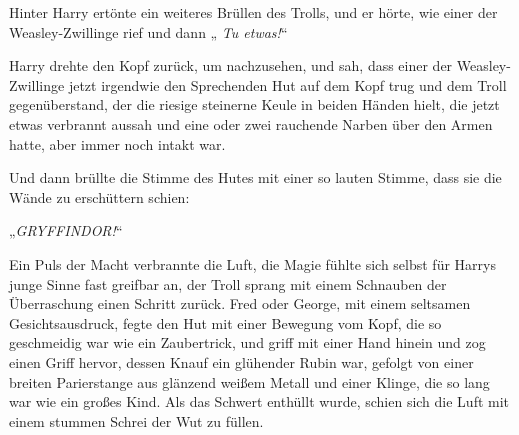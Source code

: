 Hinter Harry ertönte ein weiteres Brüllen des Trolls, und er hörte, wie einer der Weasley-Zwillinge  rief und dann „\emph{ Tu etwas!}“

Harry drehte den Kopf zurück, um nachzusehen, und sah, dass einer der Weasley-Zwillinge jetzt irgendwie den Sprechenden Hut auf dem Kopf trug und dem Troll gegenüberstand, der die riesige steinerne Keule in beiden Händen hielt, die jetzt etwas verbrannt aussah und eine oder zwei rauchende Narben über den Armen hatte, aber immer noch intakt war.

Und dann brüllte die Stimme des Hutes mit einer so lauten Stimme, dass sie die Wände zu erschüttern schien:

„\emph{GRYFFINDOR!}“

Ein Puls der Macht verbrannte die Luft, die Magie fühlte sich selbst für Harrys junge Sinne fast greifbar an, der Troll sprang mit einem Schnauben der Überraschung einen Schritt zurück. Fred oder George, mit einem seltsamen Gesichtsausdruck, fegte den Hut mit einer Bewegung vom Kopf, die so geschmeidig war wie ein Zaubertrick, und griff mit einer Hand hinein und zog einen Griff hervor, dessen Knauf ein glühender Rubin war, gefolgt von einer breiten Parierstange aus glänzend weißem Metall und einer Klinge, die so lang war wie ein großes Kind. Als das Schwert enthüllt wurde, schien sich die Luft mit einem stummen Schrei der Wut zu füllen.

